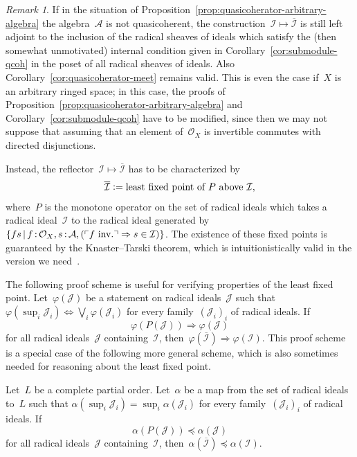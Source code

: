 \documentclass[10pt,reqno,a4paper]{amsbook}
\makeatletter
\theoremstyle{definition}
\theoremstyle{plain}
\theoremstyle{remark}
\newtheorem{rem}[defn]{Remark}
\newcommand{\A}{\mathcal{A}}
\renewcommand{\O}{\mathcal{O}}
\newcommand{\I}{\mathcal{I}}
\newcommand{\J}{\mathcal{J}}
\newcommand{\?}{\,{:}\,}
\renewcommand{\_}{\mathpunct{.}\,}
\newcommand{\speak}[1]{\ulcorner\text{\textnormal{#1}}\urcorner}
\newcommand{\inv}{inv.\@}
\newcommand{\defeq}{\vcentcolon=}
\makeatother
\begin{document}
\begin{rem}\label{rem:quasicoherator-knaster-tarski}
If in the situation of
Proposition~\ref{prop:quasicoherator-arbitrary-algebra} the algebra~$\A$ is not
quasicoherent, the construction~$\I \mapsto \overline{\I}$ is still left
adjoint to the inclusion of the radical sheaves of ideals which satisfy the (then
somewhat unmotivated) internal condition given in
Corollary~\ref{cor:submodule-qcoh} in the poset of all radical sheaves of ideals.
Also Corollary~\ref{cor:quasicoherator-meet} remains valid.
This is even the case if~$X$ is an arbitrary ringed space; in this case,
the proofs of Proposition~\ref{prop:quasicoherator-arbitrary-algebra} and
Corollary~\ref{cor:submodule-qcoh} have to be modified, since then we may not
suppose that assuming that an element of~$\O_X$ is invertible commutes with
directed disjunctions.

Instead, the reflector~$\I \mapsto \overline{\I}$ has to
be characterized by
\[ \overline{\I} \defeq \text{least fixed point of~$P$ above~$\I$}, \]
where~$P$ is the monotone operator on the set of radical ideals which takes a
radical ideal~$\I$ to the radical ideal generated by~$\{ fs \,|\, f\?\O_X,
s\?\A, (\speak{$f$ \inv} \Rightarrow s \in \I) \}$. The existence of these
fixed points is guaranteed by the Knaster--Tarski theorem, which is
intuitionistically valid in the version we need~\cite{bauer:lumsdaine:bourbaki-witt}.

The following proof scheme is useful for verifying properties of the least
fixed point. Let~$\varphi(\J)$ be a statement on radical ideals~$\J$ such that
$\varphi(\sup_i \J_i) \Leftrightarrow \bigvee_i \varphi(\J_i)$ for every
family~$(\J_i)_i$ of radical ideals. If
\[ \varphi(P(\J)) \Longrightarrow \varphi(\J) \]
for all radical ideals~$\J$ containing~$\I$, then~$\varphi(\overline{\I})
\Rightarrow \varphi(\I)$. This proof scheme is a special case of the following
more general scheme, which is also sometimes needed for reasoning about the
least fixed point.

Let~$L$ be a complete partial order. Let~$\alpha$ be a map from the set of
radical ideals to~$L$ such that $\alpha(\sup_i \J_i) = \sup_i \alpha(\J_i)$ for
every family~$(\J_i)_i$ of radical ideals. If
\[ \alpha(P(\J)) \preceq \alpha(\J) \]
for all radical ideals~$\J$ containing~$\I$, then~$\alpha(\overline{\I})
\preceq \alpha(\I)$.
\end{rem}
\end{document}

